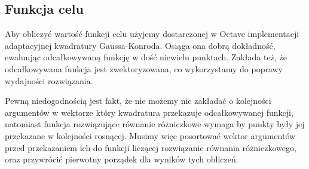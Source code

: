 \documentclass[11pt]{article}
\begin{document}
\subsection{Funkcja celu}
Aby obliczyć wartość funkcji celu użyjemy dostarczonej w Octave implementacji adaptacyjnej kwadratury Gaussa-Konroda. Osiąga ona dobrą dokładność, ewaluując odcałkowywaną funkcję w dość niewielu punktach. Zakłada też, że odcałkowywana funkcja jest zwektoryzowana, co wykorzystamy do poprawy wydajności rozwiązania.

Pewną niedogodnością jest fakt, że nie możemy nic zakładać o kolejności argumentów w wektorze który kwadratura przekazuje odcałkowywanej funkcji, natomiast funkcja rozwiązujące równanie różniczkowe wymaga by punkty były jej przekazane w kolejności rosnącej. Musimy więc posortować wektor argumentów przed przekazaniem ich do funkcji liczącej rozwiązanie równania różniczkowego, oraz przywrócić pierwotny porządek dla wyników tych obliczeń.

{}

\end{document}

